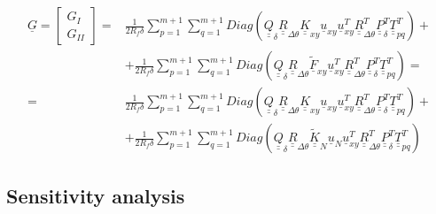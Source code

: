 \documentclass[a4paper]{jpconf}
\begin{document}
\begin{equation}
\begin{split}
\underline{G}=\begin{bmatrix}
G_{I} \\
G_{II}
\end{bmatrix}=&\frac{1}{2R_{f}\delta}\sum_{p=1}^{m+1}\sum_{q=1}^{m+1}Diag\left(\underline{\underline{Q}}_{\delta}\underline{\underline{R}}_{\Delta\theta}\underline{\underline{K}}_{xy}\underline{u}_{xy}\underline{u}_{xy}^{T}\underline{\underline{R}}_{\Delta\theta}^{T}\underline{\underline{P}}_{\delta}^{T}\underline{\underline{T}}_{pq}^{T}\right)+\\
&+\frac{1}{2R_{f}\delta}\sum_{p=1}^{m+1}\sum_{q=1}^{m+1}Diag\left(\underline{\underline{Q}}_{\delta}\underline{\underline{R}}_{\Delta\theta}\underline{\widetilde{F}}_{xy}\underline{u}_{xy}^{T}\underline{\underline{R}}_{\Delta\theta}^{T}\underline{\underline{P}}_{\delta}^{T}\underline{\underline{T}}_{pq}^{T}\right)=\\
=&\frac{1}{2R_{f}\delta}\sum_{p=1}^{m+1}\sum_{q=1}^{m+1}Diag\left(\underline{\underline{Q}}_{\delta}\underline{\underline{R}}_{\Delta\theta}\underline{\underline{K}}_{xy}\underline{u}_{xy}\underline{u}_{xy}^{T}\underline{\underline{R}}_{\Delta\theta}^{T}\underline{\underline{P}}_{\delta}^{T}\underline{\underline{T}}_{pq}^{T}\right)+\\
&+\frac{1}{2R_{f}\delta}\sum_{p=1}^{m+1}\sum_{q=1}^{m+1}Diag\left(\underline{\underline{Q}}_{\delta}\underline{\underline{R}}_{\Delta\theta}\underline{\underline{\widetilde{K}}}_{N}\underline{u}_{N}\underline{u}_{xy}^{T}\underline{\underline{R}}_{\Delta\theta}^{T}\underline{\underline{P}}_{\delta}^{T}\underline{\underline{T}}_{pq}^{T}\right)
\end{split}
\end{equation}

\subsection{Sensitivity analysis}
\end{document}
